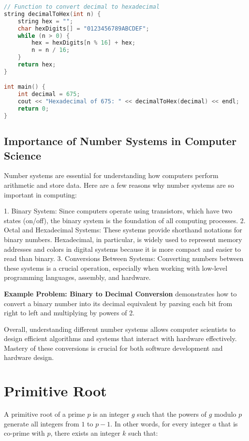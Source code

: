 \documentclass[10pt,a4paper]{article}
\begin{document}
\begin{lstlisting}[language=C++]
// Function to convert decimal to hexadecimal
string decimalToHex(int n) {
    string hex = "";
    char hexDigits[] = "0123456789ABCDEF";
    while (n > 0) {
        hex = hexDigits[n % 16] + hex;
        n = n / 16;
    }
    return hex;
}

int main() {
    int decimal = 675;
    cout << "Hexadecimal of 675: " << decimalToHex(decimal) << endl;
    return 0;
}
\end{lstlisting}

\subsection*{Importance of Number Systems in Computer Science}

Number systems are essential for understanding how computers perform arithmetic and store data. Here are a few reasons why number systems are so important in computing:

1. Binary System: Since computers operate using transistors, which have two states (on/off), the binary system is the foundation of all computing processes.
2. Octal and Hexadecimal Systems: These systems provide shorthand notations for binary numbers. Hexadecimal, in particular, is widely used to represent memory addresses and colors in digital systems because it is more compact and easier to read than binary.
3. Conversions Between Systems: Converting numbers between these systems is a crucial operation, especially when working with low-level programming languages, assembly, and hardware.

\textbf{Example Problem: Binary to Decimal Conversion} demonstrates how to convert a binary number into its decimal equivalent by parsing each bit from right to left and multiplying by powers of 2.

Overall, understanding different number systems allows computer scientists to design efficient algorithms and systems that interact with hardware effectively. Mastery of these conversions is crucial for both software development and hardware design.


\section*{Primitive Root}

A primitive root of a prime \(p\) is an integer \(g\) such that the powers of \(g\) modulo \(p\) generate all integers from \(1\) to \(p-1\). In other words, for every integer \(a\) that is co-prime with \(p\), there exists an integer \(k\) such that:
\end{document}
